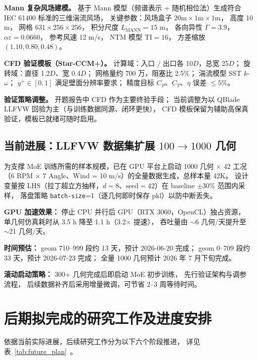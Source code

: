 \textbf{Mann 复杂风场建模。}
基于 Mann 模型（频谱表示 + 随机相位法）生成符合 IEC 61400 标准的三维湍流风场，
关键参数：风场盒子 $20\text{m} \times 1\text{m} \times 1\text{m}$，
高度 10 m，
网格 $631 \times 256 \times 256$，
积分尺度 $L_{\text{MANN}} = 15$ m，
各向异性 $\Gamma = 3.9$，
$\alpha\varepsilon = 0.0660$，
参考风速 12 m/s，
NTM 模型 $\text{TI} = 16$，
方差缩放 $(1.10, 0.80, 0.48)$。

\textbf{CFD 验证模板（Star-CCM+）。}
计算域：入口 / 出口各 10$D$，总宽 25$D$；
旋转域：直径 1.2$D$、宽 0.4$D$；
网格量约 700 万，阻塞比 2.5\%；
湍流模型 SST $k$-$\omega$；
$y^+ \in [0, 1]$ 满足壁面分辨率要求；
精度目标 $C_P$、$C_T$、$\eta$ 误差 $\leq 5\%$。

\textbf{验证策略调整。}
开题报告中 CFD 作为主要终验手段；
当前调整为以 QBlade LLFVW 回验为主（与训练数据同源、闭环更快），
CFD 模板保留为辅助高保真验证，模板已就绪可随时启用。

\subsection{当前进展：LLFVW 数据集扩展 $100 \rightarrow 1000$ 几何}

为支撑 MoE 训练所需的样本规模，已在 GPU 平台上启动 1000 几何 $\times$ 42 工况
（6 RPM $\times$ 7 Angle、Wind = 10 m/s）的全量数据生成，总样本量 42K。
设计变量按 LHS（拉丁超立方抽样，$d=8$、$\text{seed}=42$）在 baseline $\pm 30\%$ 范围内采样，
落盘策略 \texttt{batch-size}=1（逐几何即时保存 pkl）以防中断丢失。

\textbf{GPU 加速效果：}
停止 CPU 并行后 GPU（RTX 3060，OpenCL）独占资源，
单几何仿真耗时从 3.5 h 降至 1.1 h（3.2$\times$ 提速），
吞吐量由 $\sim$6 几何/天提升至 $\sim$21 几何/天。

\textbf{时间预估：}
geom 710--999 段约 13 天，预计 2026-06-20 完成；
geom 0--709 段约 33 天，预计 2026-07-23 完成；
全量 1000 几何预计 2026 年 7 月下旬完成。

\textbf{滚动启动策略：}
300+ 几何完成后即启动 MoE 初步训练，
先行验证架构与调参流程，
后续数据补齐后采用增量微调，可节省 2--3 周等待时间。

\section{后期拟完成的研究工作及进度安排}

依据当前实际进展，后续研究工作分为以下六个阶段推进，
详见表~\ref{tab:future_plan}~。

